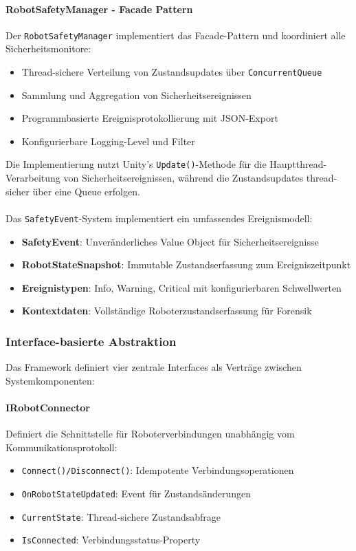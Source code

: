 \paragraph{RobotSafetyManager - Facade Pattern}
Der \texttt{RobotSafetyManager} implementiert das Facade-Pattern und
koordiniert alle Sicherheitsmonitore:
\begin{itemize}
    \item Thread-sichere Verteilung von Zustandsupdates über \texttt{ConcurrentQueue}
    \item Sammlung und Aggregation von Sicherheitsereignissen
    \item Programmbasierte Ereignisprotokollierung mit JSON-Export
    \item Konfigurierbare Logging-Level und Filter
\end{itemize}

Die Implementierung nutzt Unity's \texttt{Update()}-Methode für die
Hauptthread-Verarbeitung von Sicherheitsereignissen, während die
Zustandsupdates thread-sicher über eine Queue erfolgen.

\paragraph{}
Das \texttt{SafetyEvent}-System implementiert ein umfassendes Ereignismodell:
\begin{itemize}
    \item \textbf{SafetyEvent}: Unveränderliches Value Object für Sicherheitsereignisse
    \item \textbf{RobotStateSnapshot}: Immutable Zustandserfassung zum Ereigniszeitpunkt
    \item \textbf{Ereignistypen}: Info, Warning, Critical mit konfigurierbaren Schwellwerten
    \item \textbf{Kontextdaten}: Vollständige Roboterzustandserfassung für Forensik
\end{itemize}

\subsubsection{Interface-basierte Abstraktion}

Das Framework definiert vier zentrale Interfaces als Verträge zwischen
Systemkomponenten:

\paragraph{IRobotConnector}
Definiert die Schnittstelle für Roboterverbindungen unabhängig vom
Kommunikationsprotokoll:
\begin{itemize}
    \item \texttt{Connect()/Disconnect()}: Idempotente Verbindungsoperationen
    \item \texttt{OnRobotStateUpdated}: Event für Zustandsänderungen
    \item \texttt{CurrentState}: Thread-sichere Zustandsabfrage
    \item \texttt{IsConnected}: Verbindungsstatus-Property
\end{itemize}

